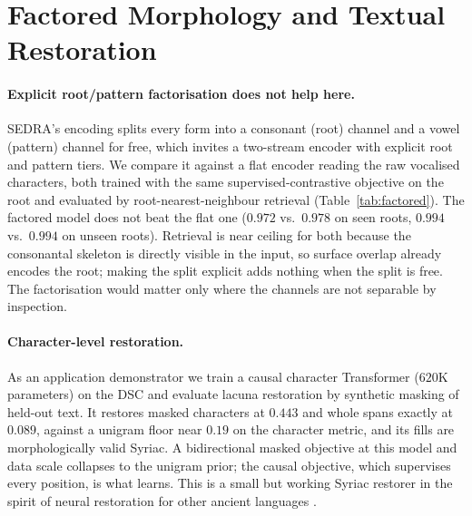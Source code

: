 \documentclass[11pt]{article}
\begin{document}
\section{Factored Morphology and Textual Restoration}
\label{sec:other}

\paragraph{Explicit root/pattern factorisation does not help here.}
SEDRA's encoding splits every form into a consonant (root) channel and a vowel
(pattern) channel for free, which invites a two-stream encoder with explicit root
and pattern tiers. We compare it against a flat encoder reading the raw vocalised
characters, both trained with the same supervised-contrastive objective on the
root and evaluated by root-nearest-neighbour retrieval (Table~\ref{tab:factored}).
The factored model does not beat the flat one ($0.972$ vs.\ $0.978$ on seen roots,
$0.994$ vs.\ $0.994$ on unseen roots). Retrieval is near ceiling for both because
the consonantal skeleton is directly visible in the input, so surface overlap
already encodes the root; making the split explicit adds nothing when the split is
free. The factorisation would matter only where the channels are not separable by
inspection.

\paragraph{Character-level restoration.}
As an application demonstrator we train a causal character Transformer
($620$K parameters) on the DSC and evaluate lacuna restoration by synthetic
masking of held-out text. It restores masked characters at $0.443$ and whole spans
exactly at $0.089$, against a unigram floor near $0.19$ on the character metric,
and its fills are morphologically valid Syriac. A bidirectional masked objective at
this model and data scale collapses to the unigram prior; the causal objective,
which supervises every position, is what learns. This is a small but working Syriac
restorer in the spirit of neural restoration for other ancient languages
\citep{assael2022ithaca}.

\begin{table}[t]
  \centering
  
  \caption{Factored root/pattern encoder vs.\ a flat encoder, root-nearest-neighbour
  retrieval on SEDRA forms split by root. ``Unseen'' roots are absent from training,
  the decisive generalisation case; both models are near ceiling.}
  \label{tab:factored}
\end{table}
\end{document}

